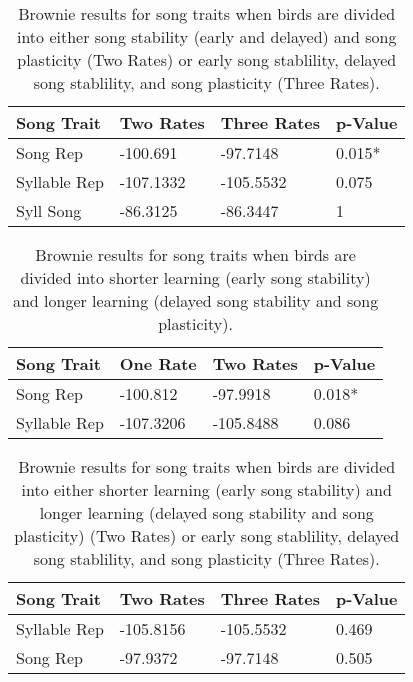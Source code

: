 \documentclass[a4paper,12pt]{article}
\begin{document}
\begin{table}[ht]
\caption{Brownie results for song traits when birds are divided into either song stability (early and delayed) and song plasticity (Two Rates) or early song stablility, delayed song stablility, and song plasticity (Three Rates).}
\centering
\begin{tabular}{llll}
  \hline
Song Trait & Two Rates & Three Rates & p-Value \\ 
  \hline
    Song Rep & -100.691 & -97.7148 & 0.015* \\ 
Syllable Rep & -107.1332 & -105.5532 & 0.075 \\ 
  Syll Song & -86.3125 & -86.3447 & 1 \\ 
   \hline
\end{tabular}
\end{table}



\begin{table}[ht]
\caption{Brownie results for song traits when birds are divided into shorter learning (early song stability) and longer learning (delayed song stability and song plasticity).}
\centering
\begin{tabular}{llll}
  \hline
Song Trait & One Rate & Two Rates & p-Value \\ 
  \hline
Song Rep & -100.812 & -97.9918 & 0.018* \\ 
  Syllable Rep & -107.3206 & -105.8488 & 0.086 \\ 
   \hline
\end{tabular}
\end{table}



\begin{table}[ht]
\caption{Brownie results for song traits when birds are divided into either shorter learning (early song stability) and longer learning (delayed song stability and song plasticity) (Two Rates) or early song stablility, delayed song stablility, and song plasticity (Three Rates).}
\label{tab:last}
\centering
\begin{tabular}{llll}
  \hline
Song Trait & Two Rates & Three Rates & p-Value \\ 
  \hline
Syllable Rep & -105.8156 & -105.5532 & 0.469 \\ 
  Song Rep & -97.9372 & -97.7148 & 0.505 \\ 
   \hline
\end{tabular}
\end{table}
\end{document}
